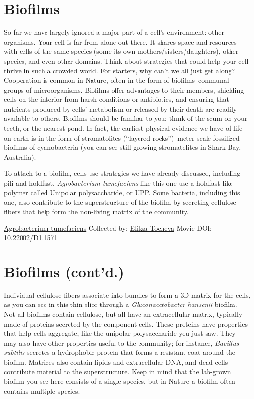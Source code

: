 \documentclass[]{tufte-book}
\begin{document}
\hypertarget{biofilms}{%
\section{Biofilms}\label{biofilms}}

So far we have largely ignored a major part of a cell's environment: other organisms. Your cell is far from alone out there. It shares space and resources with cells of the same species (some its own mothers/sisters/daughters), other species, and even other domains. Think about strategies that could help your cell thrive in such a crowded world. For starters, why can't we all just get along? Cooperation is common in Nature, often in the form of biofilms--communal groups of microorganisms. Biofilms offer advantages to their members, shielding cells on the interior from harsh conditions or antibiotics, and ensuring that nutrients produced by cells' metabolism or released by their death are readily available to others. Biofilms should be familiar to you; think of the scum on your teeth, or the nearest pond. In fact, the earliest physical evidence we have of life on earth is in the form of stromatolites (``layered rocks'')--meter-scale fossilized biofilms of cyanobacteria (you can see still-growing stromatolites in Shark Bay, Australia).

To attach to a biofilm, cells use strategies we have already discussed, including pili and holdfast. \emph{Agrobacterium tumefaciens} like this one use a holdfast-like polymer called Unipolar polysaccharide, or UPP. Some bacteria, including this one, also contribute to the superstructure of the biofilm by secreting cellulose fibers that help form the non-living matrix of the community.



\hypertarget{htmlwidget-cde976ea1e541d97d418}{}

\label{fig:9-1}\protect\hyperlink{tree}{Agrobacterium tumefaciens} Collected by: \protect\hyperlink{elitza_tocheva}{Elitza Tocheva} Movie DOI: \href{https://doi.org/10.22002/D1.1571}{10.22002/D1.1571}

\hypertarget{biofilms-contd.}{%
\section{Biofilms (cont'd.)}\label{biofilms-contd.}}

Individual cellulose fibers associate into bundles to form a 3D matrix for the cells, as you can see in this thin slice through a \emph{Gluconacetobacter hansenii} biofilm. Not all biofilms contain cellulose, but all have an extracellular matrix, typically made of proteins secreted by the component cells. These proteins have properties that help cells aggregate, like the unipolar polysaccharide you just saw. They may also have other properties useful to the community; for instance, \emph{Bacillus subtilis} secretes a hydrophobic protein that forms a resistant coat around the biofilm. Matrices also contain lipids and extracellular DNA, and dead cells contribute material to the superstructure. Keep in mind that the lab-grown biofilm you see here consists of a single species, but in Nature a biofilm often contains multiple species.
\end{document}

